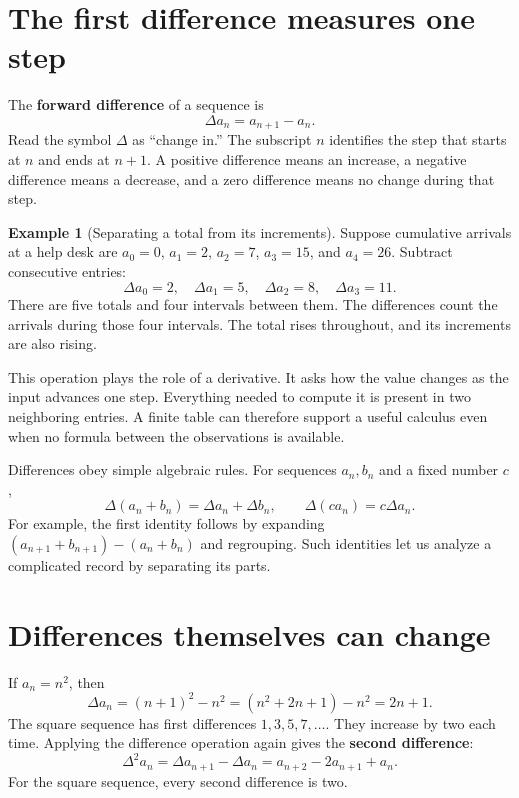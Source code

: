\documentclass[11pt,oneside,openany]{book}
\theoremstyle{definition}
\newtheorem{example}{Example}[chapter]
\theoremstyle{remark}
\numberwithin{equation}{chapter}
\begin{document}
\section{The first difference measures one step}\label{ch01-the-first-difference-measures-one-step}

The \textbf{forward difference} of a sequence is \[\boxed{\Delta a_n=a_{n+1}-a_n.}\] Read the symbol \(\Delta\) as ``change in.'' The subscript \(n\) identifies the step that starts at \(n\) and ends at \(n+1\). A positive difference means an increase, a negative difference means a decrease, and a zero difference means no change during that step.

\begin{example}[Separating a total from its increments]

Suppose cumulative arrivals at a help desk are \(a_0=0\), \(a_1=2\), \(a_2=7\), \(a_3=15\), and \(a_4=26\). Subtract consecutive entries: \[\Delta a_0=2,\quad\Delta a_1=5,\quad\Delta a_2=8,\quad\Delta a_3=11.\] There are five totals and four intervals between them. The differences count the arrivals during those four intervals. The total rises throughout, and its increments are also rising.

\end{example}

This operation plays the role of a derivative. It asks how the value changes as the input advances one step. Everything needed to compute it is present in two neighboring entries. A finite table can therefore support a useful calculus even when no formula between the observations is available.

Differences obey simple algebraic rules. For sequences \(a_n,b_n\) and a fixed number \(c\), \[\Delta(a_n+b_n)=\Delta a_n+\Delta b_n,\qquad
\Delta(ca_n)=c\Delta a_n.\] For example, the first identity follows by expanding \((a_{n+1}+b_{n+1})-(a_n+b_n)\) and regrouping. Such identities let us analyze a complicated record by separating its parts.

\section{Differences themselves can change}\label{ch01-differences-themselves-can-change}

If \(a_n=n^2\), then \[\Delta a_n=(n+1)^2-n^2=(n^2+2n+1)-n^2=2n+1.\] The square sequence has first differences \(1,3,5,7,\ldots\). They increase by two each time. Applying the difference operation again gives the \textbf{second difference}: \[\Delta^2a_n=\Delta a_{n+1}-\Delta a_n
=a_{n+2}-2a_{n+1}+a_n.\] For the square sequence, every second difference is two.
\end{document}
